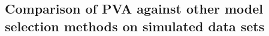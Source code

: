 






\subsection{Comparison of PVA against other model selection methods on simulated data sets}

